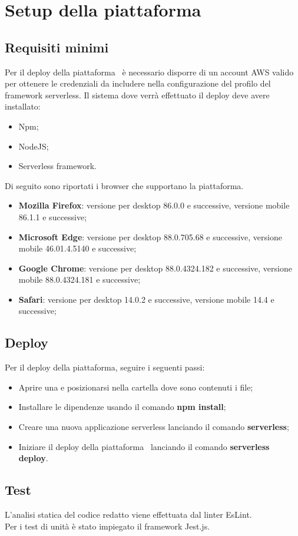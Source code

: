 \section{Setup della piattaforma}\label{Setup}
\subsection{Requisiti minimi}
Per il deploy della piattaforma \NomeProgetto\ è necessario disporre di un account AWS valido per ottenere le credenziali da includere nella configurazione del profilo del framework serverless.
Il sistema dove verrà effettuato il deploy deve avere installato:
\begin{itemize}
	\item Npm;
	\item NodeJS;
	\item Serverless framework.
\end{itemize}
Di seguito sono riportati i browser che supportano la piattaforma.
\begin{itemize}
	\item \textbf{Mozilla Firefox}: versione per desktop 86.0.0 e successive, versione mobile 86.1.1 e successive; 
	\item \textbf{Microsoft Edge}: versione per desktop 88.0.705.68 e successive, versione mobile 46.01.4.5140 e successive;
	\item \textbf{Google Chrome}: versione per desktop 88.0.4324.182 e successive, versione mobile 88.0.4324.181 e successive;
	\item \textbf{Safari}: versione per desktop 14.0.2 e successive, versione mobile 14.4 e successive; 
\end{itemize}

\subsection{Deploy}
Per il deploy della piattaforma, seguire i seguenti passi:
\begin{itemize}
	\item Aprire una  e posizionarsi nella cartella dove sono contenuti i file;
	\item Installare le dipendenze usando il comando \textbf{npm install};
	\item Creare una nuova applicazione serverless lanciando il comando \textbf{serverless};
	\item Iniziare il deploy della piattaforma \NomeProgetto\ lanciando il comando \textbf{serverless deploy}.
\end{itemize}

\subsection{Test}
L'analisi statica del codice redatto viene effettuata dal linter EsLint.\\
Per i test di unità è stato impiegato il framework Jest.js.